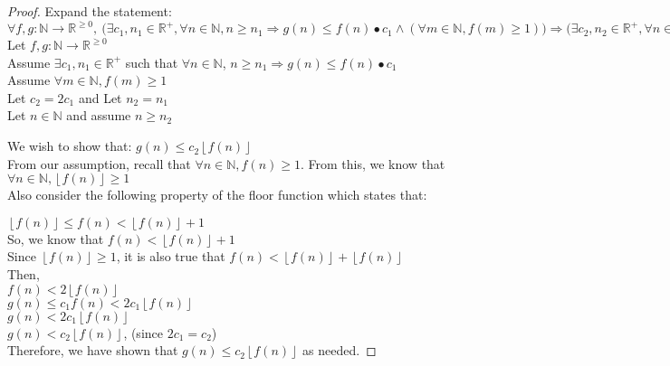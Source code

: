 \documentclass[11pt]{article}
\newcommand{\floor}[1]{\left\lfloor #1 \right\rfloor}
\begin{document}
\begin{enumerate}
\begin{proof}
Expand the statement: \\
$
\forall f, g: \mathbb{N} \to \mathbb{R}^{\geq 0},~
\Big(\exists c_1, n_1 \in \mathbb{R}^+, \forall n \in \mathbb{N}, n \geq n_1 \Rightarrow g(n) \le f(n) • c_1 \wedge (\forall m \in \mathbb{N}, f(m) \geq 1)\Big) \Rightarrow \Big(\exists c_2, n_2 \in \mathbb{R}^+, \forall n \in \mathbb{N}, n \geq n_2 \Rightarrow g(n) \le c_2 • \floor{f(n)} \Big)
$ \\

Let $f, g: \mathbb{N} \to \mathbb{R}^{\geq 0}$ \\

Assume $\exists c_1, n_1 \in \mathbb{R}^+$ such that $\forall n \in \mathbb{N}$, $n \geq n_1 \Rightarrow g(n) \le f(n) • c_1$\\ 

Assume $\forall m \in \mathbb{N}, f(m) \geq 1$ \\

Let $c_2 = 2c_1$ and Let $n_2 = n_1$ \\ 

Let $n \in \mathbb{N}$ and assume $n \ge n_2$ 

We wish to show that: $g(n) \leq c_2 \floor{f(n)}$ \\

From our assumption, recall that $\forall n \in \mathbb{N}, f(n) \ge 1$. From this, we know that $\forall n \in \mathbb{N}, \floor{f(n)} \ge 1$ \\ 

Also consider the following property of the floor function which states that: 

$\floor{f(n)} \le f(n) < \floor{f(n)}+1$ \\

So, we know that $f(n) < \floor{f(n)} + 1$ \\
Since $\floor{f(n)} \ge 1$, it is also true that $f(n) < \floor{f(n)} + \floor{f(n)}$ \\

Then, \\
$f(n) < 2 \floor{f(n)}$ \\
$g(n) \leq c_1f(n) < 2c_1 \floor{f(n)}$ \\
$g(n) < 2c_1 \floor{f(n)}$ \\
$g(n) < c_2 \floor{f(n)}$, (since $2c_1 = c_2$) \\

Therefore, we have shown that $g(n) \leq c_2 \floor{f(n)}$ as needed.  

\end{proof}
\end{enumerate}
\end{document}

